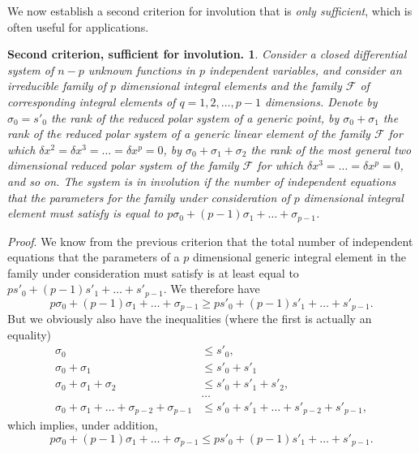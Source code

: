 \fsec We now establish a second criterion for involution that is \emph{only sufficient}, which is often useful for applications.

\newtheorem*{inv2cri}{\hspace{15pt}Second criterion, sufficient for involution.}
\begin{inv2cri}
  Consider a closed differential system of $n-p$ unknown functions in $p$ independent variables, and consider an irreducible family of $p$ dimensional integral elements and the family $\mathcal{F}$ of corresponding integral elements of $q=1,2,\dots,p-1$ dimensions. Denote by $\sigma_{0}=s'_{0}$ the rank of the reduced polar system of a generic point, by $\sigma_{0}+\sigma_{1}$ the rank of the reduced polar system of a generic linear element of the family $\mathcal{F}$ for which $\delta x^{2}=\delta x^{3}=\dots=\delta x^{p}=0$, by $\sigma_{0}+\sigma_{1}+\sigma_{2}$ the rank of the most general two dimensional reduced polar system of the family $\mathcal{F}$ for which $\delta x^{3}=\dots =\delta x^{p}=0$, and so on. The system is in involution if the number of independent equations that the parameters for the family  under consideration of $p$ dimensional integral element must satisfy is equal to $p\sigma_{0}+(p-1)\sigma_{1}+\dots+\sigma_{p-1}$.
\end{inv2cri}

\vspace{12pt}\fsec \emph{Proof}. We know from the previous criterion that the total number of independent equations that the parameters of a $p$ dimensional generic integral element in the family under consideration must satisfy is at least equal to $ps'_{0}+(p-1)s'_{1}+\dots+s'_{p-1}$. We therefore have
\[
p\sigma_{0}+(p-1)\sigma_{1}+\dots+\sigma_{p-1}\ge ps'_{0}+(p-1)s'_{1}+\dots+s'_{p-1}.
\]
But we obviously also have the inequalities (where the first is actually an equality)
\begin{align*}
  \sigma_{0}&\le s'_{0},\\
  \sigma_{0}+\sigma_{1}&\le s'_{0}+s'_{1}\\
  \sigma_{0}+\sigma_{1}+\sigma_{2}&\le s'_{0}+s'_{1}+s'_{2},\\
  &\dots\\
  \sigma_{0}+\sigma_{1}+\dots+\sigma_{p-2}+\sigma_{p-1}&\le s'_{0}+s'_{1}+\dots+s'_{p-2}+s'_{p-1},
\end{align*}
which implies, under addition,
\[
p\sigma_{0}+(p-1)\sigma_{1}+\dots+\sigma_{p-1}\le ps'_{0}+(p-1)s'_{1}+\dots+s'_{p-1}.
\]

